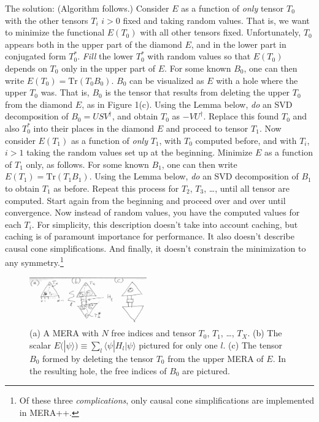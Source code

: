\documentclass[twocolumn,showpacs,preprintnumbers,amsmath,amssymb,prb]{revtex4}
\begin{document}
The solution: (Algorithm follows.) 
Consider $E$ as a function of \emph{only} tensor $T_0$ with the other tensors $T_i$ $i>0$ fixed
and taking random values.
That is, we want to minimize the functional $E(T_0)$ with all other tensors fixed. Unfortunately, 
 $T_0$ appears both in the upper part of the diamond $E$, and in the lower part in conjugated form $T_0^*$.
\emph{Fill} the lower $T_0^*$ with random values so that $E(T_0)$ depends on $T_0$ only in the upper part of $E$.
For some known $B_0$, one can then write $E(T_0) = \textrm{Tr}(T_0 B_0)$.
$B_0$ can be visualized as $E$ with a hole where the upper $T_0$ was. That is, $B_0$ is the tensor that results
from deleting the upper $T_0$ from the diamond $E$, as in Figure 1(c).
Using the Lemma below, \emph{do} an SVD decomposition of $B_0 = USV^\dagger$, and obtain $T_0$ as $-VU^\dagger$.
Replace this found $T_0$ and also $T_0^*$ into their places in the diamond $E$ and proceed to tensor $T_1$.
Now consider $E(T_1)$ as a function of \emph{only} $T_1$, with $T_0$ computed before, and with $T_i$, $i > 1$
taking
the random values set up at the beginning. Minimize $E$ as a function of $T_1$ only, as follows.
For some known $B_1$, one can then write $E(T_1) = \textrm{Tr}(T_1 B_1)$. 
Using the Lemma below, \emph{do} an SVD decomposition of $B_1$ to obtain $T_1$ as before.
Repeat this process for $T_2$, $T_3$, \ldots, until all tensor are computed. Start again from the beginning and proceed over and over until
convergence. Now instead of random values, you
have the computed values for each $T_i$.
For simplicity, this description doesn't take into account caching, but caching is of paramount importance
for performance. It also doesn't describe causal cone simplifications. And finally, it doesn't constrain the
minimization to any symmetry.\footnote{Of these three \emph{complications}, only causal cone simplifications are
	implemented in MERA++.}
\begin{figure}[b]
	\includegraphics[width=0.45\textwidth]{figure.png}
	\caption{(a) A MERA with $N$ free indices and tensor $T_0$, $T_1$, \ldots, $T_X$. 
		(b) The scalar $E(|\psi\rangle)\equiv \sum_l\langle \psi | H_l |\psi\rangle$ pictured for only one $l$.
		(c) The tensor $B_0$ formed by deleting the tensor $T_0$ from the upper MERA of $E$. In the resulting hole, the
		free indices of $B_0$ are pictured.}
\end{figure}
\end{document}
